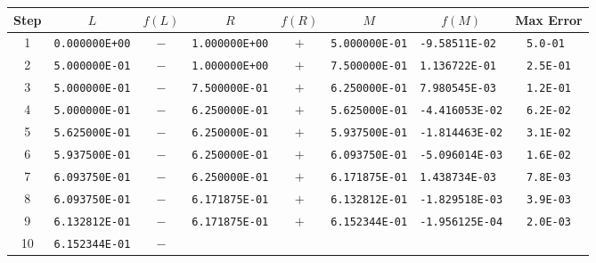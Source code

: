 \begin{longtable}[t]{c|c|c|c|c|c|c|c}
    Step                  &
    \( L \)               & \( f(L) \)             &
    \( R \)               & \( f(R) \)             &
    \( M \)               & \( f(M) \)             & Max Error        \\ \hline \hline
    1                     &
    \texttt{0.000000E+00} & \(-\)                  &
    \texttt{1.000000E+00} & \(+\)                  &
    \texttt{5.000000E-01} & \texttt{-9.58511E-02 } & \texttt{5.0-01 } \\
    2                     &
    \texttt{5.000000E-01} & \(-\)                  &
    \texttt{1.000000E+00} & \(+\)                  &
    \texttt{7.500000E-01} & \texttt{1.136722E-01 } & \texttt{2.5E-01} \\
    3                     &
    \texttt{5.000000E-01} & \(-\)                  &
    \texttt{7.500000E-01} & \(+\)                  &
    \texttt{6.250000E-01} & \texttt{7.980545E-03 } & \texttt{1.2E-01} \\
    4                     &
    \texttt{5.000000E-01} & \(-\)                  &
    \texttt{6.250000E-01} & \(+\)                  &
    \texttt{5.625000E-01} & \texttt{-4.416053E-02} & \texttt{6.2E-02} \\
    5                     &
    \texttt{5.625000E-01} & \(-\)                  &
    \texttt{6.250000E-01} & \(+\)                  &
    \texttt{5.937500E-01} & \texttt{-1.814463E-02} & \texttt{3.1E-02} \\
    6                     &
    \texttt{5.937500E-01} & \(-\)                  &
    \texttt{6.250000E-01} & \(+\)                  &
    \texttt{6.093750E-01} & \texttt{-5.096014E-03} & \texttt{1.6E-02} \\
    7                     &
    \texttt{6.093750E-01} & \(-\)                  &
    \texttt{6.250000E-01} & \(+\)                  &
    \texttt{6.171875E-01} & \texttt{1.438734E-03 } & \texttt{7.8E-03} \\
    8                     &
    \texttt{6.093750E-01} & \(-\)                  &
    \texttt{6.171875E-01} & \(+\)                  &
    \texttt{6.132812E-01} & \texttt{-1.829518E-03} & \texttt{3.9E-03} \\
    9                     &
    \texttt{6.132812E-01} & \(-\)                  &
    \texttt{6.171875E-01} & \(+\)                  &
    \texttt{6.152344E-01} & \texttt{-1.956125E-04} & \texttt{2.0E-03} \\
    10                    &
    \texttt{6.152344E-01} & \(-\)                  &

\end{longtable}
